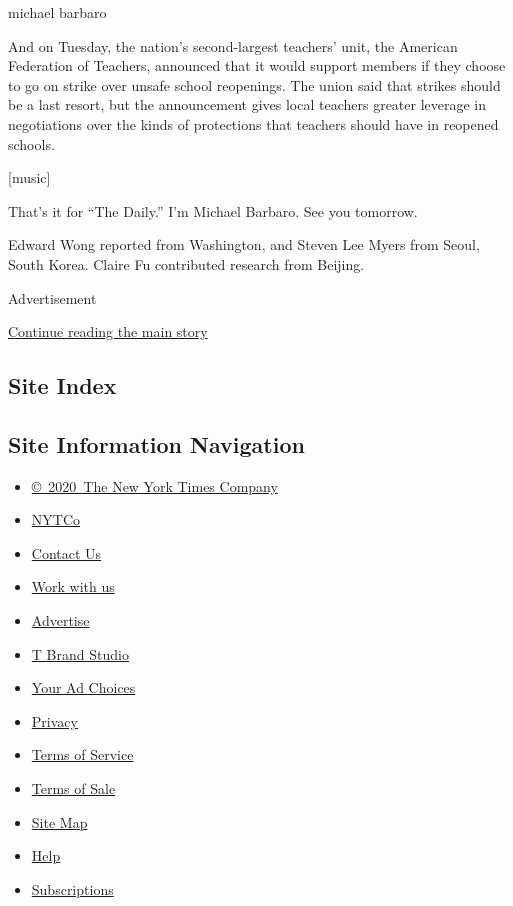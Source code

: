 michael barbaro

And on Tuesday, the nation's second-largest teachers' unit, the American
Federation of Teachers, announced that it would support members if they
choose to go on strike over unsafe school reopenings. The union said
that strikes should be a last resort, but the announcement gives local
teachers greater leverage in negotiations over the kinds of protections
that teachers should have in reopened schools.

{[}music{]}

That's it for ``The Daily.'' I'm Michael Barbaro. See you tomorrow.

Edward Wong reported from Washington, and Steven Lee Myers from Seoul,
South Korea. Claire Fu contributed research from Beijing.

Advertisement

\protect\hyperlink{after-bottom}{Continue reading the main story}

\hypertarget{site-index}{%
\subsection{Site Index}\label{site-index}}

\hypertarget{site-information-navigation}{%
\subsection{Site Information
Navigation}\label{site-information-navigation}}

\begin{itemize}
\tightlist
\item
  \href{https://help.nytimes.com/hc/en-us/articles/115014792127-Copyright-notice}{©~2020~The
  New York Times Company}
\end{itemize}

\begin{itemize}
\tightlist
\item
  \href{https://www.nytco.com/}{NYTCo}
\item
  \href{https://help.nytimes.com/hc/en-us/articles/115015385887-Contact-Us}{Contact
  Us}
\item
  \href{https://www.nytco.com/careers/}{Work with us}
\item
  \href{https://nytmediakit.com/}{Advertise}
\item
  \href{http://www.tbrandstudio.com/}{T Brand Studio}
\item
  \href{https://www.nytimes.com/privacy/cookie-policy\#how-do-i-manage-trackers}{Your
  Ad Choices}
\item
  \href{https://www.nytimes.com/privacy}{Privacy}
\item
  \href{https://help.nytimes.com/hc/en-us/articles/115014893428-Terms-of-service}{Terms
  of Service}
\item
  \href{https://help.nytimes.com/hc/en-us/articles/115014893968-Terms-of-sale}{Terms
  of Sale}
\item
  \href{https://spiderbites.nytimes.com}{Site Map}
\item
  \href{https://help.nytimes.com/hc/en-us}{Help}
\item
  \href{https://www.nytimes.com/subscription?campaignId=37WXW}{Subscriptions}
\end{itemize}
